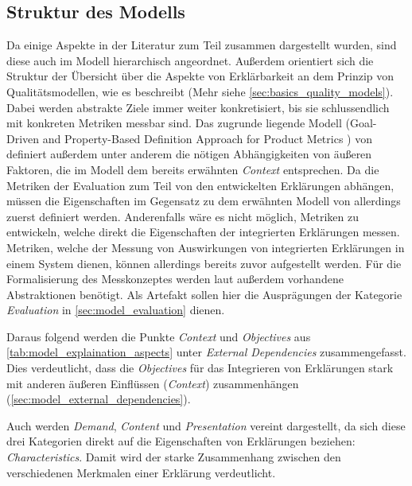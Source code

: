 \subsection{Struktur des Modells}

Da einige Aspekte in der Literatur zum Teil zusammen dargestellt wurden, sind diese auch im Modell hierarchisch angeordnet. Außerdem orientiert sich die Struktur der Übersicht über die Aspekte von Erklärbarkeit an dem Prinzip von Qualitätsmodellen, wie es \citeauthor{schneider2012abenteuer} beschreibt \cite{schneider2012abenteuer} (Mehr siehe \autoref{sec:basics_quality_models}). Dabei werden abstrakte Ziele immer weiter konkretisiert, bis sie schlussendlich mit konkreten Metriken messbar sind. Das zugrunde liegende Modell (\glqq Goal-Driven and Property-Based Definition Approach for Product Metrics\grqq{} \cite{briand1995goal}) von \citeauthor{briand1995goal} definiert außerdem unter anderem die nötigen Abhängigkeiten von äußeren Faktoren, die im Modell dem bereits erwähnten \textit{Context} entsprechen. Da die Metriken der Evaluation zum Teil von den entwickelten Erklärungen abhängen, müssen die Eigenschaften im Gegensatz zu dem erwähnten Modell von \citeauthor{schneider2012abenteuer} allerdings zuerst definiert werden. Anderenfalls wäre es nicht möglich, Metriken zu entwickeln, welche direkt die Eigenschaften der integrierten Erklärungen messen. Metriken, welche der Messung von Auswirkungen von integrierten Erklärungen in einem System dienen, können allerdings bereits zuvor aufgestellt werden. Für die Formalisierung des Messkonzeptes werden laut \citeauthor{briand1995goal} außerdem vorhandene Abstraktionen benötigt. Als Artefakt sollen hier die Ausprägungen der Kategorie \textit{Evaluation} in \autoref{sec:model_evaluation} dienen.

\smallbreak

Daraus folgend werden die Punkte \textit{Context} und \textit{Objectives} aus \autoref{tab:model_explaination_aspects} unter \textit{External Dependencies} zusammengefasst. Dies verdeutlicht, dass die \textit{Objectives} für das Integrieren von Erklärungen stark mit anderen äußeren Einflüssen (\textit{Context}) zusammenhängen (\autoref{sec:model_external_dependencies}).

Auch werden \textit{Demand}, \textit{Content} und \textit{Presentation} vereint dargestellt, da sich diese drei Kategorien direkt auf die Eigenschaften von Erklärungen beziehen: \textit{Characteristics}. Damit wird der starke Zusammenhang zwischen den verschiedenen Merkmalen einer Erklärung verdeutlicht.

